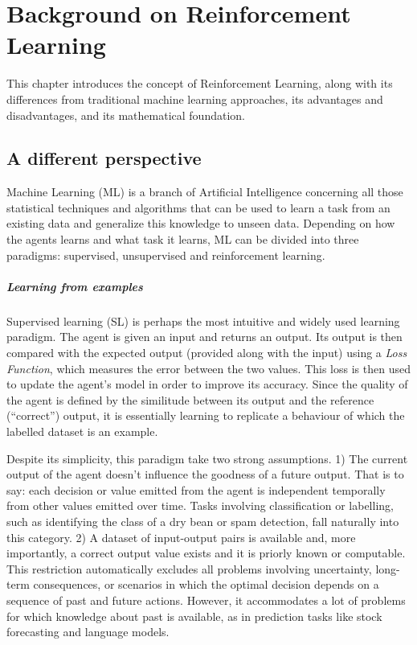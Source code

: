 \chapter{Background on Reinforcement Learning}
\label{chapter:reinforcement-learning}

This chapter introduces the concept of Reinforcement Learning, along with its differences from traditional machine learning approaches, its advantages and disadvantages, and its mathematical foundation.

\section{A different perspective}

Machine Learning (ML) is a branch of Artificial Intelligence concerning all those statistical techniques and algorithms that can be used to learn a task from an existing data and generalize this knowledge to unseen data. Depending on how the agents learns and what task it learns, ML can be divided into three paradigms: supervised, unsupervised and reinforcement learning.

\paragraph{Learning from examples}

Supervised learning (SL) \cite{nasteski2017overview} is perhaps the most intuitive and widely used learning paradigm.
The agent is given an input and returns an output. Its output is then compared with the expected output (provided along with the input) using a \textit{Loss Function}, which measures the error between the two values.
This loss is then used to update the agent's model in order to improve its accuracy.
Since the quality of the agent is defined by the similitude between its output and the reference (``correct'') output, it is essentially learning to replicate a behaviour of which the labelled dataset is an example.

Despite its simplicity, this paradigm take two strong assumptions.
1) The current output of the agent doesn't influence the goodness of a future output. That is to say: each decision or value emitted from the agent is independent temporally from other values emitted over time.
Tasks involving classification or labelling, such as identifying the class of a dry bean or spam detection, fall naturally into this category.
2) A dataset of input-output pairs is available and, more importantly, a correct output value exists and it is priorly known or computable. This restriction automatically excludes all problems involving uncertainty, long-term consequences, or scenarios in which the optimal decision depends on a sequence of past and future actions. However, it accommodates a lot of problems for which knowledge about past is available, as in prediction tasks like stock forecasting and language models.

